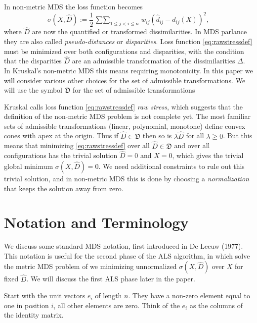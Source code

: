 \documentclass[
  12pt,
]{article}
\newcommand{\jis}{\mathop{\sum\sum}_{1\leq j<i\leq n}}
\begin{document}
In non-metric MDS the loss function becomes
\begin{equation}
\sigma(X,\hat D):=\frac12\jis w_{ij}(\hat d_{ij}-d_{ij}(X))^2,
\label{eq:rawstressdef}
\end{equation}
where \(\hat D\) are now the quantified or transformed dissimilarities. In
MDS parlance they are also called \emph{pseudo-distances} or \emph{disparities}.
Loss function \eqref{eq:rawstressdef} must be minimized over both
configurations and disparities, with the condition that the disparities
\(\hat D\) are an admissible transformation of the dissimilarities \(\Delta\).
In Kruskal's non-metric MDS this means requiring monotonicity. In this paper
we will consider various other choices for the set of admissible
transformations. We will use the symbol \(\mathfrak{D}\) for the set of
admissible transformations

Kruskal calls loss function \eqref{eq:rawstressdef} \emph{raw stress}, which suggests
that the definition of the non-metric MDS problem is not complete yet.
The most familiar sets of admissible transformations (linear, polynomial, monotone)
define convex cones with apex at the origin. Thus if \(\hat D\in\mathfrak{D}\) then
so is \(\lambda\hat D\) for all \(\lambda\geq 0\). But this means that minimizing
\eqref{eq:rawstressdef} over all \(\hat D\in\mathfrak{D}\) and over all
configurations has the trivial solution \(\hat D=0\) and \(X=0\), which gives
the trivial global minimum \(\sigma(X,\hat D)=0\). We need additional constraints to rule out this trivial solution, and in non-metric MDS this is done by choosing a \emph{normalization} that keeps the solution away from zero.

\section*{Notation and Terminology}\label{notation-and-terminology}

We discuss some standard MDS notation, first introduced in De Leeuw (1977). This
notation is useful for the second phase of the ALS algorithm, in which solve the metric MDS problem of we minimizing unnormalized
\(\sigma(X,\hat D)\) over \(X\) for fixed \(\hat D\). We will discuss the first ALS phase
later in the paper.

Start with the unit vectors \(e_i\) of length \(n\). They have a non-zero
element equal to one in position \(i\), all other elements are zero. Think
of the \(e_i\) as the columns of the identity matrix.
\end{document}
